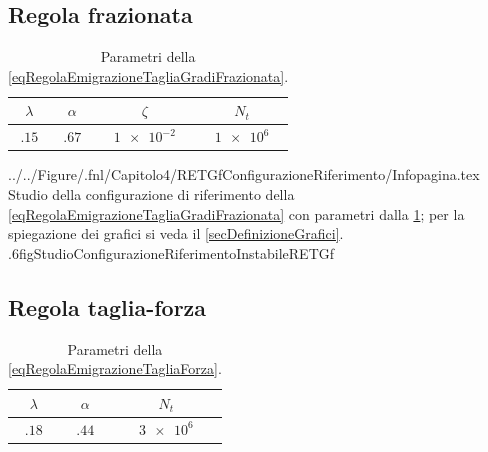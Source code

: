         \subsection{Regola frazionata}
            

            \begin{table}[htb]
                \centering
                \begin{tabular}{cccc}
                    \hline
                    \(\lambda\)&\(\alpha\)&\(\zeta\)&\(N_t\)\\
                    \hline
                    \(\num{.15}\)&\(\num{.67}\)&\(\num{1e-2}\)&\(\num{1e6}\)\\
                    \hline
                \end{tabular}
                \caption{Parametri della \ref{eqRegolaEmigrazioneTagliaGradiFrazionata}.}
                \label{tabParametriRegolaEmigrazioneTagliaGradiFrazionata}
            \end{table}

                {../../Figure/.fnl/Capitolo4/RETGfConfigurazioneRiferimento/Infopagina.tex}
                {Studio della configurazione di riferimento della \ref{eqRegolaEmigrazioneTagliaGradiFrazionata} con parametri dalla \cref{tabParametriRegolaEmigrazioneTagliaGradiFrazionata}; per la spiegazione dei grafici si veda il \cref{secDefinizioneGrafici}.}
                {.6\linewidth}{figStudioConfigurazioneRiferimentoInstabileRETGf}

        \subsection{Regola taglia-forza}

            
            \begin{table}[htb]
                \centering
                \begin{tabular}{ccc}
                    \hline
                    \(\lambda\)&\(\alpha\)&\(N_t\)\\
                    \hline
                    \(\num{.18}\)&\(\num{.44}\)&\(\num{3e6}\)\\
                    \hline
                \end{tabular}
                \caption{Parametri della \ref{eqRegolaEmigrazioneTagliaForza}.}
                \label{tabParametriRegolaEmigrazioneTagliaForza}
            \end{table}

